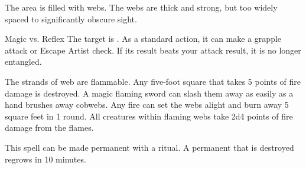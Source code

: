 \begin{spellheader}
\end{spellheader}
\begin{spellcontent}
    \begin{spelltargetinginfo}
    \end{spelltargetinginfo}
    \begin{spelleffects}
        \spelleffect The area is filled with webs. The webs are thick and strong, but too widely spaced to significantly obscure sight. %
        \spelldur{\durshort \dismissable}
    \end{spelleffects}
\end{spellcontent}
\begin{spellsubcontent}
    \begin{spelltargetinginfo}
    \end{spelltargetinginfo}
    \begin{spelleffects}
        \begin{spellattack}{Magic vs. Reflex}
            \spellsuccess The target is \entangled. As a standard action, it can make a grapple attack or Escape Artist check. If its result beats your attack result, it is no longer entangled.
        \end{spellattack}
    \end{spelleffects}
\end{spellsubcontent}
\begin{spellfooter}
    \spellnotes The strands of web are flammable. Any five-foot square that takes 5 points of fire damage is destroyed. A magic flaming sword can slash them away as easily as a hand brushes away cobwebs. Any fire can set the webs alight and burn away 5 square feet in 1 round. All creatures within flaming webs take 2d4 points of fire damage from the flames.

    This spell can be made permanent with a  ritual. A permanent  that is destroyed regrows in 10 minutes.
\end{spellfooter}

